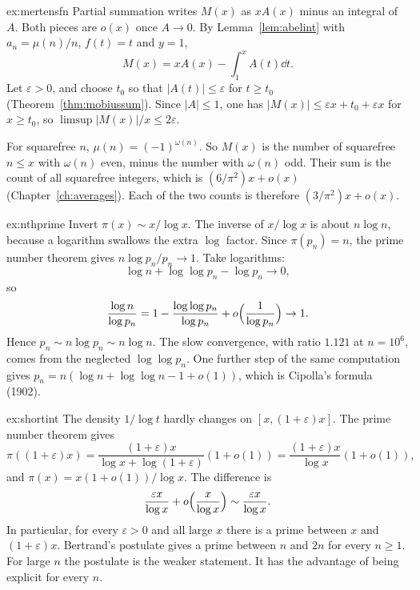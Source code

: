 \begin{solution}{ex:mertensfn}
\idea Partial summation writes $M(x)$ as $xA(x)$ minus an integral of $A$. Both pieces are $o(x)$ once $A\to0$.
\writeup By Lemma~\ref{lem:abelint} with $a_n=\mu(n)/n$, $f(t)=t$ and $y=1$,
\[
M(x)=xA(x)-\int_1^xA(t)\dd t.
\]
Let $\varepsilon>0$, and choose $t_0$ so that $|A(t)|\le\varepsilon$ for $t\ge t_0$ (Theorem~\ref{thm:mobiussum}). Since $|A|\le1$, one has $|M(x)|\le\varepsilon x+t_0+\varepsilon x$ for $x\ge t_0$, so $\limsup|M(x)|/x\le2\varepsilon$.

For squarefree $n$, $\mu(n)=(-1)^{\omega(n)}$. So $M(x)$ is the number of squarefree $n\le x$ with $\omega(n)$ even, minus the number with $\omega(n)$ odd. Their sum is the count of all squarefree integers, which is $(6/\pi^2)x+o(x)$ (Chapter~\ref{ch:averages}). Each of the two counts is therefore $(3/\pi^2)x+o(x)$.
\end{solution}

\begin{solution}{ex:nthprime}
\idea Invert $\pi(x)\sim x/\log x$. The inverse of $x/\log x$ is about $n\log n$, because a logarithm swallows the extra $\log$ factor.
\writeup Since $\pi(p_n)=n$, the prime number theorem gives $n\log p_n/p_n\to1$. Take logarithms:
\[
\log n+\log\log p_n-\log p_n\to0,
\]
so
\[
\frac{\log n}{\log p_n}=1-\frac{\log\log p_n}{\log p_n}+o\Bigl(\frac1{\log p_n}\Bigr)\to1.
\]
Hence $p_n\sim n\log p_n\sim n\log n$. The slow convergence, with ratio $1.121$ at $n=10^6$, comes from the neglected $\log\log p_n$. One further step of the same computation gives $p_n=n(\log n+\log\log n-1+o(1))$, which is Cipolla's formula (1902).
\end{solution}

\begin{solution}{ex:shortint}
\idea The density $1/\log t$ hardly changes on $[x,(1+\varepsilon)x]$.
\writeup The prime number theorem gives
\[
\pi((1+\varepsilon)x)=\frac{(1+\varepsilon)x}{\log x+\log(1+\varepsilon)}(1+o(1))=\frac{(1+\varepsilon)x}{\log x}(1+o(1)),
\]
and $\pi(x)=x(1+o(1))/\log x$. The difference is
\[
\frac{\varepsilon x}{\log x}+o\Bigl(\frac x{\log x}\Bigr)\sim\frac{\varepsilon x}{\log x}.
\]
In particular, for every $\varepsilon>0$ and all large $x$ there is a prime between $x$ and $(1+\varepsilon)x$. Bertrand's postulate gives a prime between $n$ and $2n$ for every $n\ge1$. For large $n$ the postulate is the weaker statement. It has the advantage of being explicit for every $n$.
\end{solution}

